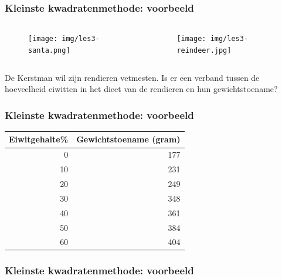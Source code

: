 \begin{frame}
	\frametitle{Kleinste kwadratenmethode: voorbeeld}
	\begin{columns}
		\begin{column}{0.5\textwidth}
			
			\begin{figure}
				\centering
				\texttt{[image: img/les3-santa.png]}
				\label{fig:les3-santa}
			\end{figure}
			
		\end{column}
		\begin{column}{0.5\textwidth}
			
			\begin{figure}
				\centering
				\texttt{[image: img/les3-reindeer.jpg]}
				\label{fig:les3-reindeer}
			\end{figure}
			
		\end{column}
	\end{columns}
	De Kerstman wil zijn rendieren vetmesten. Is er een verband
	tussen de hoeveelheid eiwitten in het dieet van de rendieren
	en hun gewichtstoename?
	
\end{frame}

\begin{frame}
	\frametitle{Kleinste kwadratenmethode: voorbeeld}
	\begin{table}[h] \centering
		\begin{tabular}{@{}rr@{}} \toprule
			Eiwitgehalte\%& Gewichtstoename (gram)  \\
			\midrule
			0   & 177 \\
			10  & 231 \\
			20  & 249 \\
			30  & 348 \\
			40  & 361 \\
			50  & 384 \\
			60  & 404 \\
			\bottomrule
		\end{tabular}
	\end{table}
\end{frame}

\begin{frame}
	\frametitle{Kleinste kwadratenmethode: voorbeeld}
	\centering
\end{frame}



